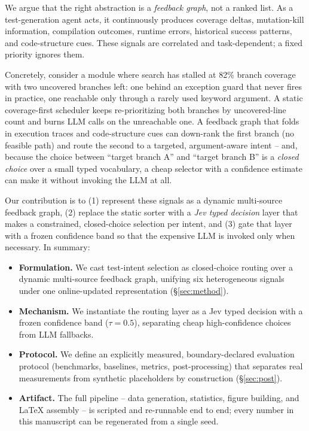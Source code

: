 \documentclass[11pt]{article}
\begin{document}
We argue that the right abstraction is a \emph{feedback graph}, not a ranked list. As a test-generation agent acts, it continuously produces coverage deltas, mutation-kill information, compilation outcomes, runtime errors, historical success patterns, and code-structure cues. These signals are correlated and task-dependent; a fixed priority ignores them.

Concretely, consider a module where search has stalled at 82\% branch coverage with two uncovered branches left: one behind an exception guard that never fires in practice, one reachable only through a rarely used keyword argument. A static coverage-first scheduler keeps re-prioritizing both branches by uncovered-line count and burns LLM calls on the unreachable one. A feedback graph that folds in execution traces and code-structure cues can down-rank the first branch (no feasible path) and route the second to a targeted, argument-aware intent -- and, because the choice between ``target branch A'' and ``target branch B'' is a \emph{closed choice} over a small typed vocabulary, a cheap selector with a confidence estimate can make it without invoking the LLM at all.

Our contribution is to (1) represent these signals as a dynamic multi-source feedback graph, (2) replace the static sorter with a \emph{Jev typed decision} layer that makes a constrained, closed-choice selection per intent, and (3) gate that layer with a frozen confidence band so that the expensive LLM is invoked only when necessary. In summary:

\begin{itemize}
  \item \textbf{Formulation.} We cast test-intent selection as closed-choice routing over a dynamic multi-source feedback graph, unifying six heterogeneous signals under one online-updated representation (\S\ref{sec:method}).
  \item \textbf{Mechanism.} We instantiate the routing layer as a Jev typed decision with a frozen confidence band ($\tau=0.5$), separating cheap high-confidence choices from LLM fallbacks.
  \item \textbf{Protocol.} We define an explicitly measured, boundary-declared evaluation protocol (benchmarks, baselines, metrics, post-processing) that separates real measurements from synthetic placeholders by construction (\S\ref{sec:post}).
  \item \textbf{Artifact.} The full pipeline -- data generation, statistics, figure building, and LaTeX assembly -- is scripted and re-runnable end to end; every number in this manuscript can be regenerated from a single seed.
\end{itemize}
\end{document}
